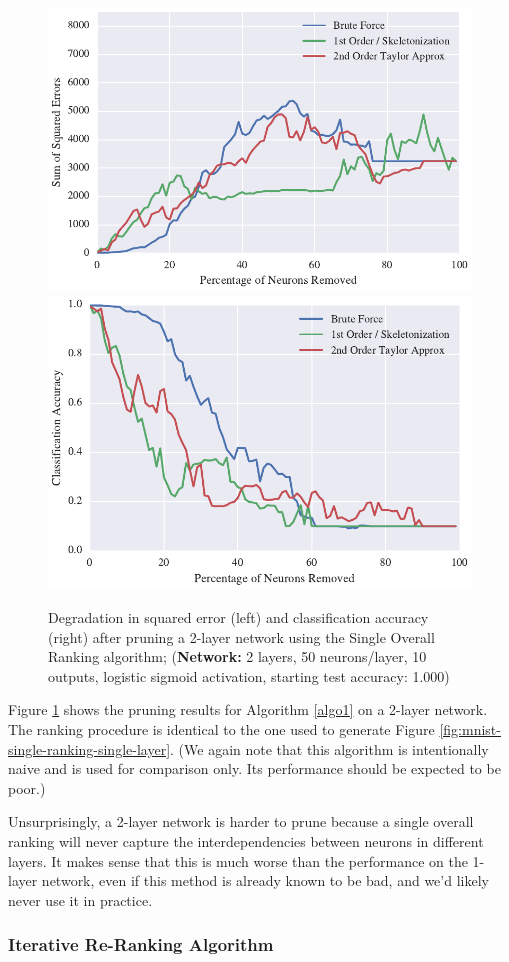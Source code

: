 \begin{figure}[!hb]
\centering
\includegraphics[width=0.49\linewidth]{png/mnist-deep-single-pass-method.pdf}
\includegraphics[width=0.49\linewidth]{png/mnist-deep-single-pass-accuracy.pdf}
\caption{Degradation in squared error (left) and classification accuracy (right) after pruning a 2-layer network using the Single Overall Ranking algorithm; (\textbf{Network:} 2 layers, 50 neurons/layer, 10 outputs, logistic sigmoid activation, starting test accuracy: 1.000)}
\label{fig:mnist-single-ranking-double-layer}
\end{figure}

Figure \ref{fig:mnist-single-ranking-double-layer} shows the pruning results for Algorithm \ref{algo1} on a 2-layer network. The ranking procedure is identical to the one used to generate Figure \ref{fig:mnist-single-ranking-single-layer}. (We again note that this algorithm is intentionally naive and is used for comparison only. Its performance should be expected to be poor.) 

Unsurprisingly, a 2-layer network is harder to prune because a single overall ranking will never capture the interdependencies between neurons in different layers. It makes sense that this is much worse than the performance on the 1-layer network, even if this method is already known to be bad, and we'd likely never use it in practice. 


\subsubsection{Iterative Re-Ranking Algorithm}

